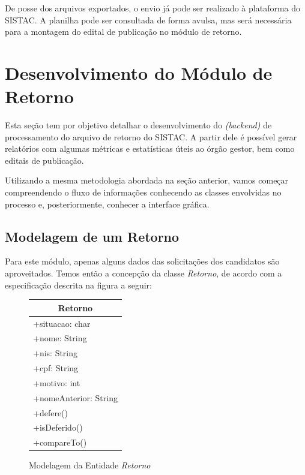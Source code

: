 \documentclass[
	12pt,			%
	openright,		%
	oneside,	
	a4paper,		%
	english,		%
	brazil			%
]{abntex2/abntex2}  %
\begin{document}
	De posse dos arquivos exportados, o envio já pode ser realizado à plataforma do SISTAC. A planilha pode ser consultada de forma avulsa, mas será necessária para a montagem do edital de publicação no módulo de retorno.

\section{Desenvolvimento do Módulo de Retorno}
	
	Esta seção tem por objetivo detalhar o desenvolvimento do \textit{(backend)} de processamento do arquivo de retorno do SISTAC. A partir dele é possível gerar relatórios com algumas métricas e estatísticas úteis ao órgão gestor, bem como editais de publicação.
	
	Utilizando a mesma metodologia abordada na seção anterior, vamos começar compreendendo o fluxo de informações conhecendo as classes envolvidas no processo e, posteriormente, conhecer a interface gráfica.
	
	\subsection{Modelagem de um Retorno}
	
	Para este módulo, apenas alguns dados das solicitações dos candidatos são aproveitados. Temos então a concepção da classe \textit{Retorno}, de acordo com a especificação descrita na figura a seguir:
	
	\begin{figure}[H]
		\begin{center}
			
			\caption{Modelagem da Entidade \textit{Retorno}}
			\label{retorno-uml}
				
			\begin{tabular}{|l|}
				\hline
				\multicolumn{1}{|c|}{\textbf{Retorno}} \\ \hline
				+situacao: char                        \\
				+nome: String                          \\
				+nis: String                           \\
				+cpf: String                           \\
				+motivo: int                           \\
				+nomeAnterior: String                  \\ \hline
				+defere()                              \\
				+isDeferido()                          \\
				+compareTo()                           \\ \hline
			\end{tabular}
				
			
		\end{center}
	\end{figure}
	
\end{document}
